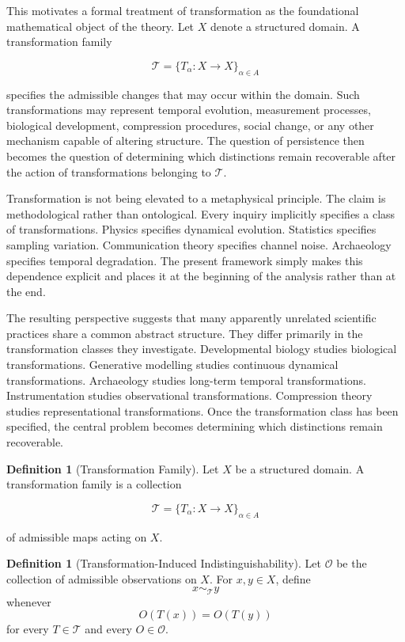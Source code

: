 \documentclass[12pt,oneside]{article}
\theoremstyle{definition}
\newtheorem{definition}[theorem]{Definition} \newtheorem{axiom}[theorem]{Axiom} \newtheorem{remark}[theorem]{Remark} \newtheorem{example}[theorem]{Example}
\begin{document}
This motivates a formal treatment of transformation as the foundational mathematical object of the theory. Let \(X\) denote a structured domain. A transformation family

\[
\mathcal{T}
=
\{T_{\alpha}:X\rightarrow X\}_{\alpha\in A}
\]

specifies the admissible changes that may occur within the domain. Such transformations may represent temporal evolution, measurement processes, biological development, compression procedures, social change, or any other mechanism capable of altering structure. The question of persistence then becomes the question of determining which distinctions remain recoverable after the action of transformations belonging to \(\mathcal{T}\).


Transformation is not being elevated to a metaphysical principle. The claim is methodological rather than ontological. Every inquiry implicitly specifies a class of transformations. Physics specifies dynamical evolution. Statistics specifies sampling variation. Communication theory specifies channel noise. Archaeology specifies temporal degradation. The present framework simply makes this dependence explicit and places it at the beginning of the analysis rather than at the end.

The resulting perspective suggests that many apparently unrelated scientific practices share a common abstract structure. They differ primarily in the transformation classes they investigate. Developmental biology studies biological transformations. Generative modelling studies continuous dynamical transformations. Archaeology studies long-term temporal transformations. Instrumentation studies observational transformations. Compression theory studies representational transformations. Once the transformation class has been specified, the central problem becomes determining which distinctions remain recoverable.

\begin{definition}[Transformation Family]
Let \(X\) be a structured domain. A transformation family is a collection

\[
\mathcal{T}
=
\{T_{\alpha}:X\rightarrow X\}_{\alpha\in A}
\]

of admissible maps acting on \(X\).
\end{definition}

\begin{definition}[Transformation-Induced Indistinguishability]
Let \(\mathcal{O}\) be the collection of admissible observations on \(X\).
For \(x, y \in X\), define
\[
x \sim_{\mathcal{T}} y
\]
whenever
\[
O(T(x)) = O(T(y))
\]
for every \(T \in \mathcal{T}\) and every \(O \in \mathcal{O}\).
\end{definition}
\end{document}
